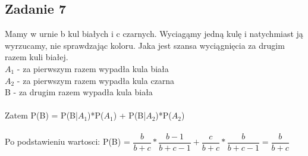 \subsection{Zadanie 7}

Mamy w urnie b kul białych i c czarnych. Wyciagąmy jedną kulę i natychmiast ją wyrzucamy, nie sprawdzając koloru. Jaka jest szansa wyciągnięcia za drugim razem kuli białej.\\

\noindent
$A_{1}$ - za pierwszym razem wypadła kula biała\\
$A_{2}$ - za pierwszym razem wypadła kula czarna\\
B - za drugim razem wypadła kula biała\\\\
Zatem P(B) = P(B|$A_{1}$)*P($A_{1}$) + P(B|$A_{2}$)*P($A_{2}$)\\\\
Po podstawieniu wartosci:
P(B) = $\dfrac{b}{b+c}*\dfrac{b-1}{b + c - 1} + \dfrac{c}{b+c}*\dfrac{b}{b + c - 1}= \dfrac{b}{b+c}$

